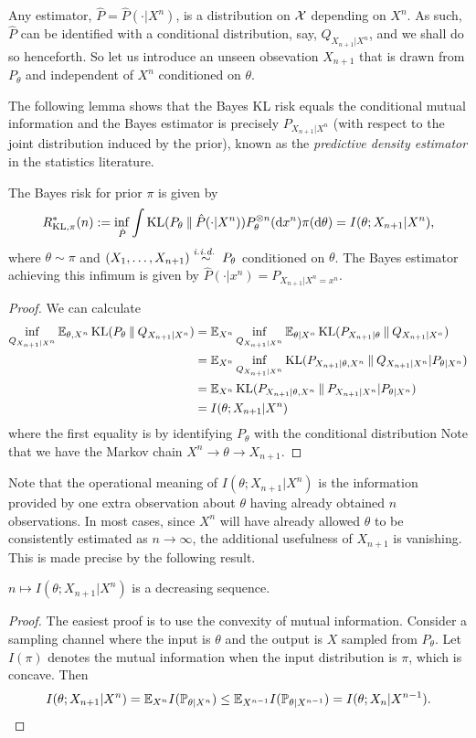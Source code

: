 Any estimator, $\hat{P}=\hat{P}(\cdot|X^n)$, is a distribution on $\mathcal{X}$ depending on $X^n$.
As such, $\hat{P}$ can be identified with a conditional distribution, say, $Q_{X_{n+1}|X^n}$, and we shall do so henceforth.
So let us introduce an unseen obsevation $X_{n+1}$ that is drawn from $P_\theta$ and independent of $X^n$ conditioned on $\theta$. 

The following lemma shows that the Bayes KL risk equals the conditional mutual information and the Bayes estimator is precisely $P_{X_{n+1}|X^n}$ (with respect to the joint distribution induced by the prior),
known as the \textit{predictive density estimator} in the statistics literature.
\begin{lemma}
    The Bayes risk for prior $\pi$ is given by
    \[R^*_{\operatorname{KL},\pi}(n):=\inf_{\hat{P}} \int \operatorname{KL}(P_\theta\mathbin{\|}\hat{P}(\cdot|X^n))P_\theta^{\otimes n}(\mathrm{d} x^n)\pi(\mathrm{d}\theta)=I(\theta;X_{n+1}|X^n),\]
    where $\theta\sim\pi$ and $(X_1,\dots,X_{n+1})\stackrel{\textit{i.i.d.~}}{\sim}P_\theta$ conditioned on $\theta$.
    The Bayes estimator achieving this infimum is given by $\hat{P}(\cdot|x^n)=P_{X_{n+1}|X^n=x^n}$.
\end{lemma}
\begin{proof}
    We can calculate
    \begin{align*}
        \inf_{Q_{X_{n+1}|X^n}}\mathbb{E}_{\theta,X^n}\operatorname{KL}(P_\theta\mathbin{\|} Q_{X_{n+1}|X^n})
        &=\mathbb{E}_{X^n}\inf_{Q_{X_{n+1}|X^n}}\mathbb{E}_{\theta|X^n}\operatorname{KL}(P_{X_{n+1}|\theta}\mathbin{\|} Q_{X_{n+1}|X^n})\\
        &=\mathbb{E}_{X^n}\inf_{Q_{X_{n+1}|X^n}}\operatorname{KL}(P_{X_{n+1}|\theta,X^n}\mathbin{\|} Q_{X_{n+1}|X^n}|P_{\theta|X^n})\\
        &=\mathbb{E}_{X^n}\operatorname{KL}(P_{X_{n+1}|\theta,X^n}\mathbin{\|} P_{X_{n+1}|X^n}|P_{\theta|X^n})\\
        &=I(\theta;X_{n+1}|X^n)
    \end{align*}
    where the first equality is by identifying $P_\theta$ with the conditional distribution 
    Note that we have the Markov chain $X^n\to\theta\to X_{n+1}$.
\end{proof}

Note that the operational meaning of $I(\theta;X_{n+1}|X^n)$ is the information provided by one extra observation about $\theta$ having already obtained $n$ observations.
In most cases, since $X^n$ will have already allowed $\theta$ to be consistently estimated as $n\to\infty$, the additional usefulness of $X_{n+1}$ is vanishing.
This is made precise by the following result.
\begin{lemma}
    $n\mapsto I(\theta;X_{n+1}|X^n)$ is a decreasing sequence.
\end{lemma}
\begin{proof}
    The easiest proof is to use the convexity of mutual information.
    Consider a sampling channel where the input is $\theta$ and the output is $X$ sampled from $P_\theta$.
    Let $I(\pi)$ denotes the mutual information when the input distribution is $\pi$, which is concave. Then
    $$I(\theta;X_{n+1}|X^n)=\mathbb{E}_{X^n}I(\mathbb{P}_{\theta|X^n})\leq \mathbb{E}_{X^{n-1}}I(\mathbb{P}_{\theta|X^{n-1}})=I(\theta;X_n|X^{n-1}).$$
\end{proof}

